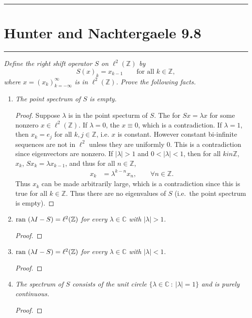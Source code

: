\documentclass{article} %
\theoremstyle{plain}
\def\Cx{\mathbb{C}}
\newcommand{\ran}{\text{\rm ran }}
\newcommand{\problem}[1]{
\vspace{.375cm}
\begin{minipage}{\textwidth}
    \begin{center}
        \noindent\rule{5cm}{1pt}
    \end{center}
    \section{\bf #1}
    \begin{center}
        \noindent\rule{5cm}{1pt}
    \end{center}
    \vspace{0.25cm}
\end{minipage}
}
\numberwithin{equation}{section} %
\numberwithin{figure}{section} %
\numberwithin{table}{section} %
\begin{document}
\problem{Hunter and Nachtergaele 9.8}
\emph{Define the right shift operator $S$ on $\ell^2(\mathbb{Z})$ by $$S(x)_k = x_{k-1} \qquad \text{for all }k \in \mathbb{Z},$$ where $x = (x_k)_{k=-\infty}^\infty$ is in $\ell^2(\mathbb{Z})$.  Prove the following facts.}
\begin{enumerate}[\it a)]
    \item
        \emph{The point spectrum of $S$ is empty.}
        \begin{proof}
            Suppose $\lambda$ is in the point specturm of $S$.  The for $Sx = \lambda x$ for some nonzero $x \in \ell^2(\mathbb{Z})$.  If $\lambda = 0$, the $x \equiv 0$, which is a contradiction.  If $\lambda = 1$, then $x_k = e_j$ for all $k,j \in \mathbb{Z}$, i.e. $x$ is constant.  However constant bi-infinite sequences are not in $\ell^2$ unless they are uniformly $0$.  This is a contradiction since eigenvectors are nonzero.  If $|\lambda| > 1$ and $0 < |\lambda| < 1$, then for all $k in \mathbb{Z}$, $x_k$, $Sx_k = \lambda x_{k-1}$, and thus for all $n \in \mathbb{Z}$,
            \begin{align*}
                x_k &= \lambda^{k-n} x_n, \qquad \forall n \in \mathbb{Z}.
            \end{align*}
            Thus $x_k$ can be made arbitrarily large, which is a contradiction since this is true for all $k \in \mathbb{Z}$.  Thus there are no eigenvalues of $S$ (i.e.~the point spectrum is empty).
        \end{proof}
    \item
        \emph{$\ran(\lambda I - S) = \ell^2(\mathbb{Z})$ for every $\lambda \in \Cx$ with $|\lambda| > 1$.}
        \begin{proof}
        \end{proof}
    \item
        \emph{$\ran(\lambda I - S) = \ell^2(\mathbb{Z})$ for every $\lambda \in \Cx$ with $|\lambda| < 1$.}
        \begin{proof}
        \end{proof}
    \item
        \emph{The spectrum of $S$ consists of the unit circle $\{\lambda \in \Cx\ :\ |\lambda| = 1\}$ and is purely continuous.}
        \begin{proof}
        \end{proof}
\end{enumerate}
\end{document}

